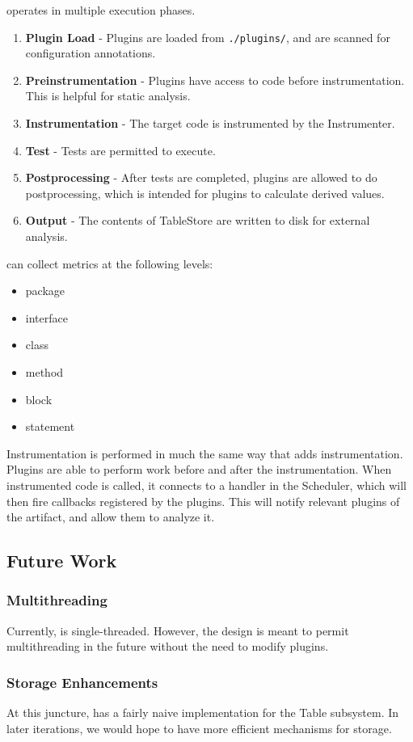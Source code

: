 \mt{} operates in multiple execution phases.
\begin{enumerate}
\item \textbf{Plugin Load} - Plugins are loaded from \texttt{./plugins/}, and are scanned for configuration annotations.
\item \textbf{Preinstrumentation} - Plugins have access to code before instrumentation. This is helpful for static analysis.
\item \textbf{Instrumentation} - The target code is instrumented by the Instrumenter.
\item \textbf{Test} - Tests are permitted to execute. 
\item \textbf{Postprocessing} - After tests are completed, plugins are allowed to do postprocessing, which is intended for plugins to calculate derived values.
\item \textbf{Output} - The contents of TableStore are written to disk for external analysis.
\end{enumerate}

\mt{} can collect metrics at the following levels:

\begin{itemize}
\item package
\item interface
\item class
\item method
\item block
\item statement
\end{itemize}

Instrumentation is performed in much the same way that \ct{} adds instrumentation. Plugins are able to perform work before and after the instrumentation. When instrumented code is called, it connects to a handler in the Scheduler, which will then fire callbacks registered by the plugins. This will notify relevant plugins of the artifact, and allow them to analyze it.


\subsection{Future Work}

\subsubsection{Multithreading}
Currently, \mt{} is single-threaded. However, the design is meant to permit multithreading in the future without the need to modify plugins. 

\subsubsection{Storage Enhancements}
At this juncture, \mt{} has a fairly naive implementation for the Table subsystem. In later iterations, we would hope to have more efficient mechanisms for storage.
